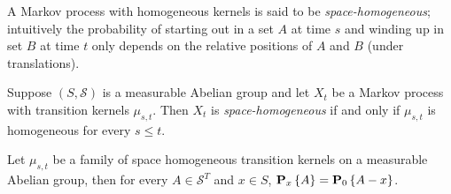 A Markov process with homogeneous kernels is said to be
\emph{space-homogeneous}; intuitively the probability of starting out
in a set $A$ at time $s$ and winding up in set $B$ at time $t$ only
depends on the relative positions of $A$ and $B$ (under translations).
\begin{defn}Suppose $(S, \mathcal{S})$ is a measurable Abelian group
  and let $X_t$ be a Markov process with transition kernels
  $\mu_{s,t}$.  Then $X_t$ is \emph{space-homogeneous} if and only if
  $\mu_{s,t}$ is homogeneous for every $s \leq t$.
\end{defn}

\begin{lem}\label{SpaceHomogeneousMarkovDistributions}Let $\mu_{s,t}$
  be a family of space homogeneous transition kernels on a
  measurable Abelian group, then for every $A \in \mathcal{S}^T$ and $x \in S$,
  $\sprobability{A}{x} = \sprobability{A-x}{0}$.
\end{lem}
